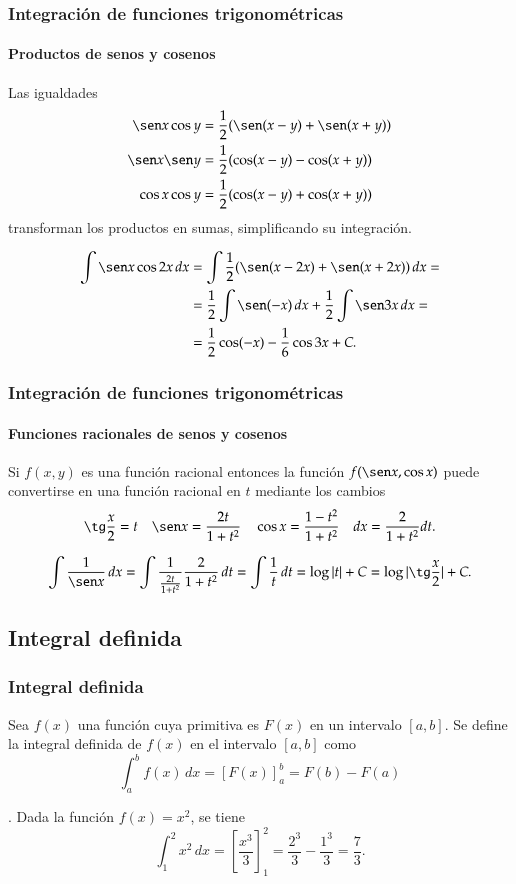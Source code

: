 \begin{frame}
	\frametitle{Integración de funciones trigonométricas}
	\framesubtitle{Productos de senos y cosenos}
	Las igualdades
	\begin{align*}
		\sen x\cos y & = \frac{1}{2}(\sen(x-y)+\sen(x+y)) \\
		\sen x\sen y & = \frac{1}{2}(\cos(x-y)-\cos(x+y)) \\
		\cos x\cos y & = \frac{1}{2}(\cos(x-y)+\cos(x+y)) 
	\end{align*}
	transforman los productos en sumas, simplificando su integración.
	
	\begin{align*}
		\int \sen x\cos 2x\, dx & = \int \frac{1}{2}(\sen(x-2x)+\sen(x+2x))\,dx =                \\
		                        & = \frac{1}{2}\int \sen (-x)\,dx +\frac{1}{2}\int \sen 3x\,dx = \\
		                        & = \frac{1}{2}\cos(-x)- \frac{1}{6}\cos 3x +C.                  
	\end{align*}
\end{frame}


\begin{frame}
	\frametitle{Integración de funciones trigonométricas}
	\framesubtitle{Funciones racionales de senos y cosenos}
	Si $f(x,y)$ es una función racional entonces la función $f(\sen x,\cos x)$ puede convertirse en una función racional en
	$t$ mediante los cambios
	\[
		\tg \frac{x}{2}=t \quad \sen x=\frac{2t}{1+t^2} \quad \cos x = \frac{1-t^2}{1+t^2} \quad dx = \frac{2}{1+t^2}dt. 
	\]
	
	\[
		\int \frac{1}{\sen x}\,dx = \int \frac{1}{\frac{2t}{1+t^2}}\frac{2}{1+t^2}\,dt = \int \frac{1}{t}\,dt = \log|t|+C =
		\log|\tg\frac{x}{2}|+C.
	\]
\end{frame}



\subsection{Integral definida}
\begin{frame}
	\frametitle{Integral definida}
	\begin{definicion}
		Sea $f(x)$ una función cuya primitiva es $F(x)$ en un intervalo $[a,b]$. Se define la integral definida de $f(x)$ en el intervalo $[a,b]$ como
		\[
			\int_a^b f(x)\,dx = \left[F(x)\right]_a^b=F(b)-F(a)
		\]
	\end{definicion}
	. Dada la función $f(x)=x^2$, se tiene
	\[
		\int_1^2 x^2\,dx = \left[\frac{x^3}{3}\right]_1^2 = \frac{2^3}{3}-\frac{1^3}{3} = \frac{7}{3}.
	\]
\end{frame}


